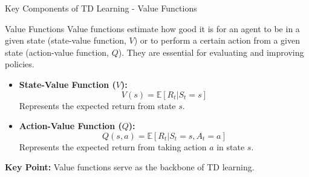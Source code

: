\documentclass[aspectratio=169]{beamer}
\begin{document}
\begin{frame}[fragile]{Key Components of TD Learning - Value Functions}
    \begin{block}{Value Functions}
        Value functions estimate how good it is for an agent to be in a given state (state-value function, $V$) or to perform a certain action from a given state (action-value function, $Q$). They are essential for evaluating and improving policies.
    \end{block}
    
    \begin{itemize}
        \item \textbf{State-Value Function ($V$):}  
        \begin{equation}
            V(s) = \mathbb{E}[R_t | S_t = s]
        \end{equation}
        Represents the expected return from state $s$.

        \item \textbf{Action-Value Function ($Q$):}  
        \begin{equation}
            Q(s, a) = \mathbb{E}[R_t | S_t = s, A_t = a]
        \end{equation}
        Represents the expected return from taking action $a$ in state $s$.
    \end{itemize}
    
    \textbf{Key Point:} Value functions serve as the backbone of TD learning.
\end{frame}
\end{document}
